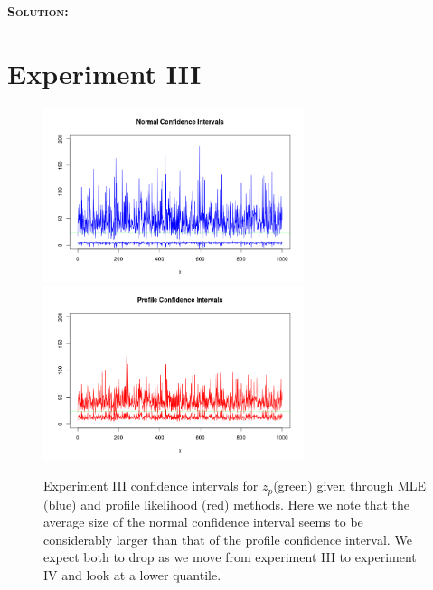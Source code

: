 \documentclass[12pt,oneside]{article}
\newenvironment{solution}
    {\textbf{\textsc{Solution:}}\\}
    {\newpage}
\begin{document}
\begin{solution}
\section*{Experiment III}
\begin{figure}[H]
\begin{center}
{\includegraphics[width=3in]{Assignments/a2/e3-nci.png}}
{\includegraphics[width=3in]{Assignments/a2/e3-pllci.png}}
\caption{Experiment III confidence intervals for $z_p$(green) given through MLE (blue) and profile likelihood (red) methods. Here we note that the average size of the normal confidence interval seems to be considerably larger than that of the profile confidence interval. We expect both to drop as we move from experiment III to experiment IV and look at a lower quantile.}
\end{center}
\end{figure}


\end{solution}
\end{document}
